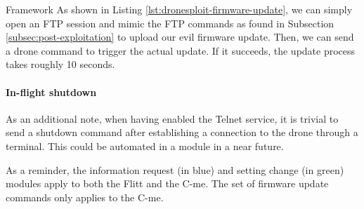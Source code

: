 \begin{chaptercover}{Framework}
As shown in Listing \ref{lst:dronesploit-firmware-update}, we can simply open an FTP session and mimic the FTP commands as found in Subsection \ref{subsec:post-exploitation} to upload our evil firmware update. Then, we can send a drone command to trigger the actual update. If it succeeds, the update process takes roughly 10 seconds.

\paragraph{In-flight shutdown} As an additional note, when having enabled the Telnet service, it is trivial to send a shutdown command after establishing a connection to the drone through a terminal. This could be automated in a module in a near future.

\begin{tip}
As a reminder, the information request (in blue) and setting change (in green) modules apply to both the Flitt and the C-me. The set of firmware update commands only applies to the C-me.
\end{tip}

\end{chaptercover}
